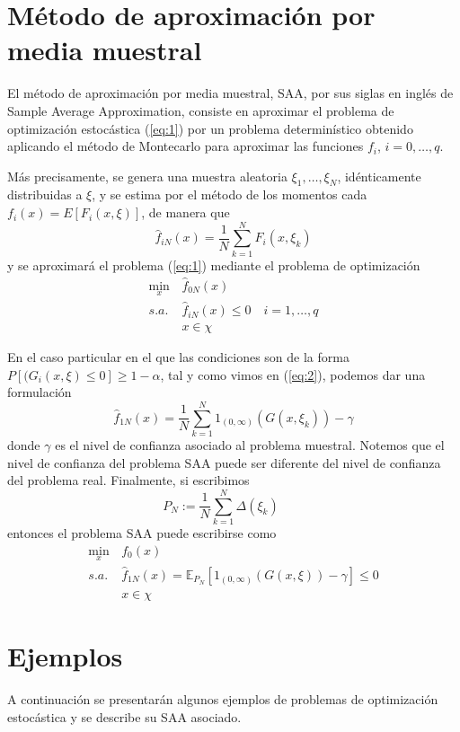 \documentclass[twoside,a4paper,openright,12pt]{book}
\newcommand{\E}{\mathbb{E}}
\begin{document}
\section{Método de aproximación por media muestral}

El método de aproximación por media muestral, SAA, por sus siglas en inglés de Sample Average Approximation, consiste en aproximar el problema de optimización estocástica (\ref{eq:1}) por un problema determinístico obtenido aplicando el método de Montecarlo para aproximar las funciones $f_i$, $i=0,\dotsc,q$.

Más precisamente, se genera una muestra aleatoria $\xi_1,\dotsc,\xi_N$, idénticamente distribuidas a $\xi$, y se estima por el método de los momentos cada $f_i(x)=E[F_i(x,\xi)]$, de manera que 
$$
\hat{f}_{iN}(x)=\frac{1}{N}\sum_{k=1}^N F_i(x,\xi_k)
$$
y se aproximará el problema (\ref{eq:1}) mediante el problema de optimización
\begin{align}
\min_{x} &\hat{f}_{0N}(x)  \nonumber\\ 
s.a.\;  & \hat{f}_{iN}(x)\leq 0 \quad i=1,\dotsc,q \tag{3} \label{eq:3}\\
& x\in\chi \nonumber
\end{align}

En el caso particular en el que las condiciones son de la forma $P[(G_i(x,\xi)\leq 0]\geq 1-\alpha$, tal y como vimos en (\ref{eq:2}), podemos dar una formulación 
$$
\hat{f}_{1N}(x) =\frac{1}{N}\sum_{k=1}^N 1_{(0,\infty)}(G(x,\xi_k))  -\gamma
$$
donde $\gamma$ es el nivel de confianza asociado al problema muestral. Notemos que el nivel de confianza del problema SAA puede ser diferente del nivel de confianza del problema real. Finalmente, si escribimos
$$
P_N:=\frac{1}{N}\sum_{k=1}^N \Delta(\xi_k) \qquad 
$$
entonces el problema SAA puede escribirse como
\begin{align*}
\min_{x} &f_0(x)  \nonumber\\ 
s.a.\;  & \hat{f}_{1N} (x) = \E_{P_N}[1_{(0,\infty)}(G(x,\xi))  -\gamma]\leq 0\\
& x\in\chi \nonumber
\end{align*}
\newpage
\section{Ejemplos}\label{sec:unotres}
A continuación se presentarán algunos ejemplos de problemas de optimización estocástica y se describe su SAA asociado.
\end{document}
